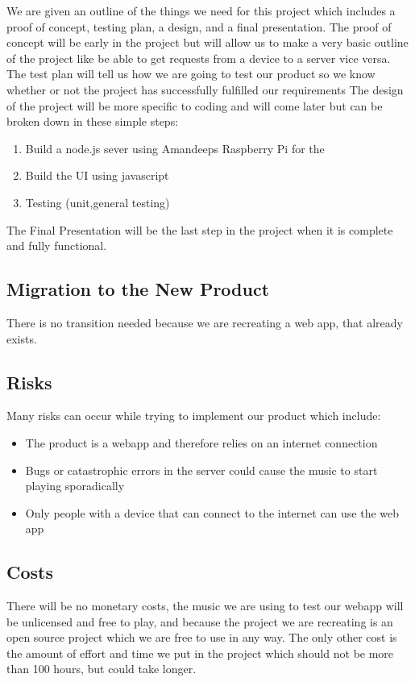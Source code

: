 \documentclass[12pt, titlepage]{article}
\begin{document}
We are given an outline of the things we need for this project which includes a proof of concept, testing plan, a design, and a final presentation. The proof of concept will be early in the project but will allow us to make a very basic outline of the project like be able to get requests from a device to a server vice versa. The test plan will tell us how we are going to test our product so we know whether or not the project has successfully fulfilled our requirements The design of the project will be more specific to coding and will come later but can be broken down in these simple steps:
\begin{enumerate}
\item Build a node.js sever using Amandeeps Raspberry Pi for the
\item Build the UI using javascript
\item Testing (unit,general testing)
\end{enumerate}
The Final Presentation will be the last step in the project when it is complete and fully functional.
\subsection{Migration to the New Product}

There is no transition needed because we are recreating a web app, that already exists.

\subsection{Risks}

Many risks can occur while trying to implement our product which include:
\begin{itemize}
\item The product is a webapp and therefore relies on an internet connection
\item Bugs or catastrophic errors in the server could cause the music to start playing sporadically
\item Only people with a device that can connect to the internet can use the web app
\end{itemize}

\subsection{Costs}

There will be no monetary costs, the music we are using to test our webapp will be unlicensed and free to play, and because the project we are recreating is an open source project which we are free to use in any way. The only other cost is the amount of effort and time we put in the project which should not be more than 100 hours, but could take longer.
\end{document}
